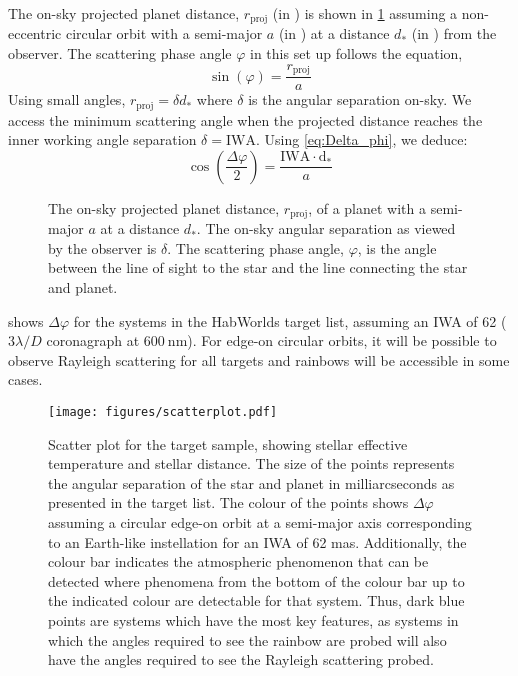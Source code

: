 \documentclass[
    usenatbib,
]{mnras}
\newcommand{\timmy}[1]{\textcolor{red}{[\textbf{Timmy:} #1]}} %
\newcommand{\hwo}{HabWorlds}
\begin{document}
The on-sky projected planet distance, $r_\mathrm{proj}$ (in \si{\au}) is shown in \cref{fig:scattering-angle} assuming a non-eccentric circular orbit with a semi-major $a$ (in \si{\au}) at a distance $d_*$ (in \si{\parsec}) from the observer. 
%
The scattering phase angle $\varphi$ in this set up follows the equation,
\begin{equation}
    \sin(\varphi) = \frac{r_\mathrm{proj}}{a}
\end{equation}
%
Using small angles, $r_\mathrm{proj} = \delta d_*$ where $\delta$ is the angular separation on-sky.
%
We access the minimum scattering angle when the projected distance reaches the inner working angle separation $\delta = \mathrm{IWA}$. 
%
Using \cref{eq:Delta_phi}, we deduce:
%
\begin{equation}
    \label{eq:scattering_angle}
    \cos\left(\dfrac{\Delta \varphi}{2}\right) = \frac{\mathrm{IWA \cdot d_*}}{a}
\end{equation}
\begin{figure}
    \centering
    
    \caption{
        The on-sky projected planet distance, $r_\mathrm{proj}$, of a planet with a semi-major $a$ at a distance $d_*$.
        The on-sky angular separation as viewed by the observer is $\delta$.
        The scattering phase angle, $\varphi$, is the angle between the line of sight to the star and the line connecting the star and planet.  
    }
    \label{fig:scattering-angle}
\end{figure}

 shows $\Delta \varphi$ for the systems in the \hwo{} target list, assuming an IWA of \SI{62}{\mas} ($3 \lambda / D$ coronagraph at $\SI{600}{\nano\meter}$). 
%
%
For edge-on circular orbits, it will be possible to observe Rayleigh scattering for all targets and rainbows will be accessible in some cases.

\begin{figure*}
    \centering
    \texttt{[image: figures/scatterplot.pdf]}
    \caption{
        Scatter plot for the target sample, showing stellar effective temperature and stellar distance.
        The size of the points represents the angular separation of the star and planet in milliarcseconds as presented in the target list.
        The colour of the points shows $\Delta \varphi$ assuming a circular edge-on orbit at a semi-major axis corresponding to an Earth-like instellation for an IWA of 62 mas.
        Additionally, the colour bar indicates the atmospheric phenomenon that can be detected where phenomena from the bottom of the colour bar up to the indicated colour are detectable for that system.
        Thus, dark blue points are systems which have the most key features, as systems in which the angles required to see the rainbow are probed will also have the angles required to see the Rayleigh scattering probed.
    }
    \label{fig:scatterplot}
\end{figure*}
\end{document}
